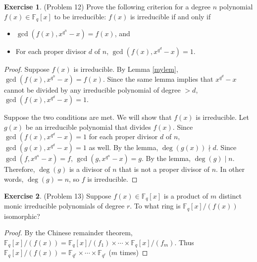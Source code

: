 \documentclass[12pt, psamsfonts]{amsart}
\theoremstyle{definition}
\newtheorem*{exer}{Exercise}
\theoremstyle{remark}
\numberwithin{equation}{section}
\begin{document}
\begin{exer}{(Problem 12)}
  Prove the following criterion for a degree $n$ polynomial $f(x) \in \mathbb{F}_q[x]$ to be irreducible:
  $f(x)$ is irreducible if and only if
  \begin{itemize}
    \item
      $\gcd(f(x), x^{q^n} - x) = f(x)$, and
    \item
      For each proper divisor $d$ of $n$, $\gcd(f(x), x^{q^d} - x) = 1$.
  \end{itemize}
\end{exer}

\begin{proof}
  Suppose $f(x)$ is irreducible.
  By Lemma \ref{mylem}, $\gcd(f(x), x^{q^n} - x) = f(x)$.
  Since the same lemma implies that $x^{q^d} - x$ cannot be divided by any irreducible polynomial of degree $> d$, $\gcd(f(x), x^{q^d} - x) = 1$.

  Suppose the two conditions are met.
  We will show that $f(x)$ is irreducible.
  Let $g(x)$ be an irreducible polynomial that divides $f(x)$.
  Since $\gcd(f(x), x^{q^d} - x) = 1$ for each proper divisor $d$ of $n$, $\gcd(g(x), x^{q^d} - x) = 1$ as well.
  By the lemma, $\deg(g(x)) \nmid d$.
  Since $\gcd(f, x^{q^n} - x) = f$, $\gcd(g, x^{q^n} - x) = g$.
  By the lemma, $\deg(g) \mid n$.
  Therefore, $\deg(g)$ is a divisor of $n$ that is not a proper divisor of $n$.
  In other words, $\deg(g) = n$, so $f$ is irreducible.
\end{proof}

\begin{exer}{(Problem 13)}
  Suppose $f(x) \in \mathbb{F}_q[x]$ is a product of $m$ distinct monic irreducible polynomials of degree $r$.
  To what ring is $\mathbb{F}_q[x]/(f(x))$ isomorphic?
\end{exer}

\begin{proof}
  By the Chinese remainder theorem, $\mathbb{F}_q[x]/(f(x)) = \mathbb{F}_q[x]/(f_1) \times \cdots \times \mathbb{F}_q[x]/(f_m)$.
  Thus $\mathbb{F}_q[x]/(f(x)) = \mathbb{F}_{q^r} \times \cdots \times \mathbb{F}_{q^r}$ ($m$ times)
\end{proof}
\end{document}
